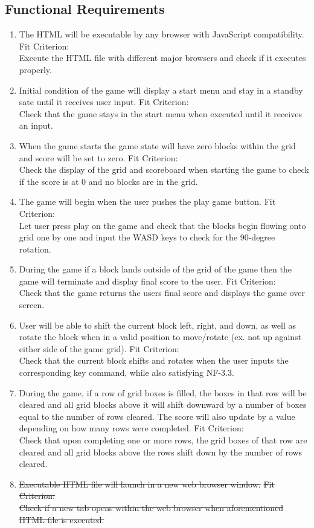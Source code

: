 \documentclass[12pt, titlepage]{article}
\begin{document}
\subsection{Functional Requirements}
\begin{enumerate}
    \item
    The HTML will be executable by any browser with JavaScript compatibility.    \subitem
    Fit Criterion: \\
    Execute the HTML file with different major browsers and check if it executes properly.    
    \item
    Initial condition of the game will display a start menu and stay in a standby sate until it receives user input.    \subitem
    Fit Criterion: \\
    Check that the game stays in the start menu when executed until it receives an input.    
    \item
    When the game starts the game state will have zero blocks within the grid and score will be set to zero.    \subitem
    Fit Criterion: \\
    Check the display of the grid and scoreboard when starting the game to check if the score is at 0 and no blocks are in the grid.    
    \item
    The game will begin when the user pushes the play game button.    \subitem
    Fit Criterion: \\
    Let user press play on the game and check that the blocks begin flowing onto grid one by one and input the WASD keys to check for the 90-degree rotation.    
    \item
    During the game if a block lands outside of the grid of the game then the game will terminate and display final score to the user.    \subitem
    Fit Criterion: \\
    Check that the game returns the users final score and displays the game over screen.
    \item
    User will be able to shift the current block left, right, and down, as well as rotate the block when in a valid position to move/rotate (ex. not up against either side of the game grid).    \subitem
    Fit Criterion: \\
    Check that the current block shifts and rotates when the user inputs the corresponding key command, while also satisfying NF-3.3.
    \item
    During the game, if a row of grid boxes is filled, the boxes in that row will be cleared and all grid blocks above it will shift downward by a number of boxes equal to the number of rows cleared. The score will also update by a value depending on how many rows were completed.    \subitem
    Fit Criterion: \\
    Check that upon completing one or more rows, the grid boxes of that row are cleared and all grid blocks above the rows shift down by the number of rows cleared.
    \item
    \sout{Executable HTML file will launch in a new web browser window.}    \subitem
    \sout{Fit Criterion:} \\
    \sout{Check if a new tab opens within the web browser when aforementioned HTML file is executed.}
\end{enumerate}
\end{document}
